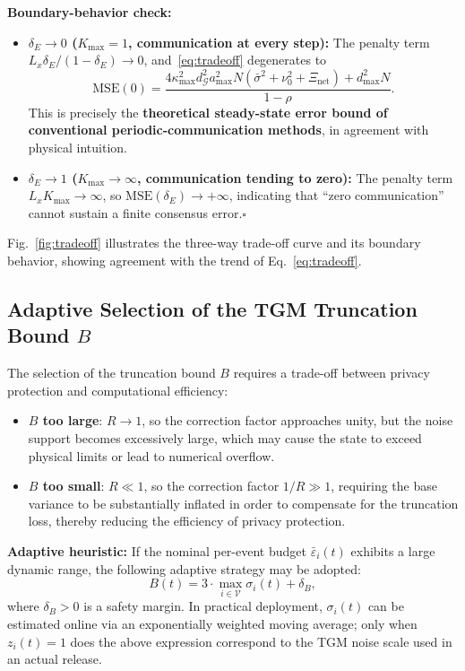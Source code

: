 \documentclass[10pt]{article}
\newcommand{\kmax}{\kappa_{\max}}
\newcommand{\sbar}{\bar{\sigma}}
\newcommand{\dmax}{d_{\max}}
\newcommand{\amax}{a_{\max}}
\newcommand{\gdeg}{d_{\mathcal{G}}}
\newcommand{\xinet}{\Xi_{\mathrm{net}}}
\begin{document}
\textbf{Boundary-behavior check:}
\begin{itemize}
  \item \textbf{$\delta_E\!\to\!0$ ($K_{\max}=1$, communication at every step):} The penalty term $L_x\delta_E/(1-\delta_E)\to0$, and~\eqref{eq:tradeoff} degenerates to
    \[
      \mathrm{MSE}(0) = \frac{4\kmax^2\gdeg^2\amax^2 N(\sbar^2+\nu_0^2+\xinet)+\dmax^2 N}{1-\rho}.
    \]
    This is precisely the \textbf{theoretical steady-state error bound of conventional periodic-communication methods}, in agreement with physical intuition.
  \item \textbf{$\delta_E\!\to\!1$ ($K_{\max}\!\to\!\infty$, communication tending to zero):} The penalty term $L_xK_{\max}\to\infty$, so $\mathrm{MSE}(\delta_E)\to+\infty$, indicating that ``zero communication'' cannot sustain a finite consensus error.\hfill$\square$
\end{itemize}

Fig.~\ref{fig:tradeoff} illustrates the three-way trade-off curve and its boundary behavior, showing agreement with the trend of Eq.~\eqref{eq:tradeoff}.

\subsection{Adaptive Selection of the TGM Truncation Bound $B$}

The selection of the truncation bound $B$ requires a trade-off between privacy protection and computational efficiency:

\begin{itemize}
  \item \textbf{$B$ too large}: $R \to 1$, so the correction factor approaches unity, but the noise support becomes excessively large, which may cause the state to exceed physical limits or lead to numerical overflow.
  \item \textbf{$B$ too small}: $R \ll 1$, so the correction factor $1/R \gg 1$, requiring the base variance to be substantially inflated in order to compensate for the truncation loss, thereby reducing the efficiency of privacy protection.
\end{itemize}

\textbf{Adaptive heuristic:} If the nominal per-event budget $\bar{\varepsilon}_i(t)$ exhibits a large dynamic range, the following adaptive strategy may be adopted:
\begin{equation}
    B(t) = 3 \cdot \max_{i\in\mathcal{V}} \sigma_i(t) + \delta_B,
\end{equation}
where $\delta_B > 0$ is a safety margin. In practical deployment, $\sigma_i(t)$ can be estimated online via an exponentially weighted moving average; only when $z_i(t)=1$ does the above expression correspond to the TGM noise scale used in an actual release.
\end{document}
